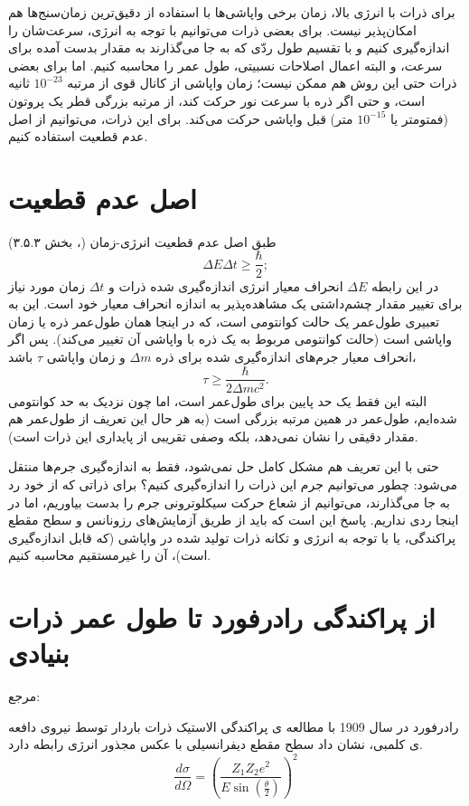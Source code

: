 \documentclass[12pt,a4paper]{article}
\begin{document}
	برای ذرات با انرژی بالا، زمان برخی واپاشی‌ها با استفاده از دقیق‌ترین زمان‌سنج‌ها هم امکان‌پذیر نیست. برای بعضی ذرات می‌توانیم با توجه به انرژی، سرعت‌شان را
	اندازه‌گیری کنیم و با تقسیم طول ردّی که به جا می‌گذارند به مقدار بدست آمده برای سرعت، و البته اعمال اصلاحات نسبیتی، طول عمر را محاسبه کنیم. اما برای
	بعضی ذرات حتی این روش هم ممکن نیست؛ زمان واپاشی از کانال قوی از مرتبه $10^{-23}$ ثانیه است، و حتی اگر ذره با سرعت نور حرکت کند، از مرتبه بزرگی قطر یک
	پروتون (فمتومتر یا $10^{-15}$ متر) قبل واپاشی حرکت می‌کند. برای این ذرات، می‌توانیم از اصل عدم قطعیت استفاده کنیم.
	\section{اصل عدم قطعیت}
	طبق اصل عدم قطعیت انرژی-زمان (\cite{griffiths_schroeter_2018}، بخش ۳.۵.۳)
	\begin{equation}
	\Delta{E}\Delta{t} \ge \frac{\hbar}{2};
	\end{equation}
	در این رابطه $\Delta{E}$ انحراف معیار انرژی اندازه‌گیری شده ذرات و $\Delta{t}$ زمان مورد نیاز برای تغییر مقدار چشم‌داشتی یک مشاهده‌پذیر به اندازه انحراف
	معیار خود است. این به تعبیری طول‌عمر یک حالت کوانتومی است، که در اینجا همان طول‌عمر ذره یا زمان واپاشی است (حالت کوانتومی مربوط به یک ذره با واپاشی آن
	تغییر می‌کند). پس اگر انحراف معیار جرم‌های اندازه‌گیری شده برای ذره $\Delta{m}$ و زمان واپاشی $\tau$ باشد،
	\begin{equation}
		\tau \ge \frac{\hbar}{2\Delta{m}c^2}.
	\end{equation}
	البته این فقط یک حد پایین برای طول‌عمر است، اما چون نزدیک به حد کوانتومی شده‌ایم، طول‌عمر در همین مرتبه بزرگی است (به هر حال این تعریف از طول‌عمر هم
	مقدار دقیقی را نشان نمی‌دهد، بلکه وصفی تقریبی از پایداری این ذرات است).
	 
	حتی با این تعریف هم مشکل کامل حل نمی‌شود، فقط به اندازه‌گیری جرم‌ها منتقل می‌شود: چطور می‌توانیم جرم این ذرات را اندازه‌گیری کنیم؟ برای ذراتی که از خود
	رد به جا می‌گذارند، می‌توانیم از شعاع حرکت سیکلوترونی جرم را بدست بیاوریم، اما در اینجا ردی نداریم. پاسخ این است که باید از طریق آزمایش‌های رزونانس و
	سطح مقطع پراکندگی، یا با توجه به انرژی و تکانه ذرات تولید شده در واپاشی (که قابل اندازه‌گیری است)، آن را غیرمستقیم محاسبه کنیم.
	\section{از پراکندگی رادرفورد تا طول عمر ذرات بنیادی }
	مرجع: \cite{deoliveirasantos2018}
	
	رادرفورد در سال 1909 با مطالعه ی پراکندگی الاستیک ذرات باردار توسط نیروی دافعه ی کلمبی، نشان داد سطح مقطع دیفرانسیلی با عکس مجذور انرژی رابطه دارد.
	\begin{equation}\label{defcros}
		\frac{d\sigma}{d\Omega}=(\frac{Z_1Z_2e^2}{E \sin(\frac{\theta}{2})})^2
	\end{equation}
	
\end{document}
